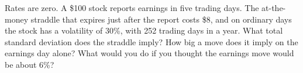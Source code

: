 \begin{question}\label{iq:iv2:options-and-bond-arithmetic-at-speed:25}
Rates are zero. A \$100 stock reports earnings in five trading days. The at-the-money straddle that expires just after the report costs \$8, and on ordinary days the stock has a volatility of 30\%, with 252 trading days in a year. What total standard deviation does the straddle imply? How big a move does it imply on the earnings day alone? What would you do if you thought the earnings move would be about 6\%?
\end{question}
